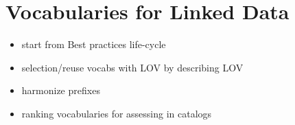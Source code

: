 \chapter{Vocabularies for Linked Data}
\label{ch:ch6}

\begin{itemize}
\item start from Best practices life-cycle
\item selection/reuse vocabs with LOV by describing LOV
\item harmonize prefixes
\item ranking vocabularies for assessing in catalogs
\end{itemize}